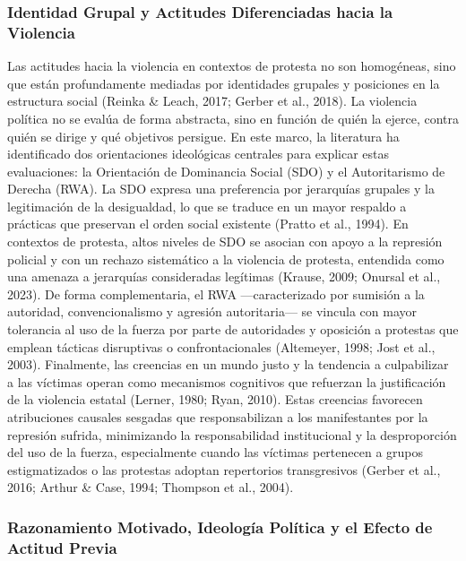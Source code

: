 \documentclass[
  13pt,
]{article}
\begin{document}
\subsubsection{Identidad Grupal y Actitudes Diferenciadas hacia la
Violencia}\label{identidad-grupal-y-actitudes-diferenciadas-hacia-la-violencia}

Las actitudes hacia la violencia en contextos de protesta no son
homogéneas, sino que están profundamente mediadas por identidades
grupales y posiciones en la estructura social (Reinka \& Leach, 2017;
Gerber et al., 2018). La violencia política no se evalúa de forma
abstracta, sino en función de quién la ejerce, contra quién se dirige y
qué objetivos persigue. En este marco, la literatura ha identificado dos
orientaciones ideológicas centrales para explicar estas evaluaciones: la
Orientación de Dominancia Social (SDO) y el Autoritarismo de Derecha
(RWA). La SDO expresa una preferencia por jerarquías grupales y la
legitimación de la desigualdad, lo que se traduce en un mayor respaldo a
prácticas que preservan el orden social existente (Pratto et al., 1994).
En contextos de protesta, altos niveles de SDO se asocian con apoyo a la
represión policial y con un rechazo sistemático a la violencia de
protesta, entendida como una amenaza a jerarquías consideradas legítimas
(Krause, 2009; Onursal et al., 2023). De forma complementaria, el RWA
---caracterizado por sumisión a la autoridad, convencionalismo y
agresión autoritaria--- se vincula con mayor tolerancia al uso de la
fuerza por parte de autoridades y oposición a protestas que emplean
tácticas disruptivas o confrontacionales (Altemeyer, 1998; Jost et al.,
2003). Finalmente, las creencias en un mundo justo y la tendencia a
culpabilizar a las víctimas operan como mecanismos cognitivos que
refuerzan la justificación de la violencia estatal (Lerner, 1980; Ryan,
2010). Estas creencias favorecen atribuciones causales sesgadas que
responsabilizan a los manifestantes por la represión sufrida,
minimizando la responsabilidad institucional y la desproporción del uso
de la fuerza, especialmente cuando las víctimas pertenecen a grupos
estigmatizados o las protestas adoptan repertorios transgresivos (Gerber
et al., 2016; Arthur \& Case, 1994; Thompson et al., 2004).

\subsubsection{Razonamiento Motivado, Ideología Política y el Efecto de
Actitud
Previa}\label{razonamiento-motivado-ideologuxeda-poluxedtica-y-el-efecto-de-actitud-previa}
\end{document}
